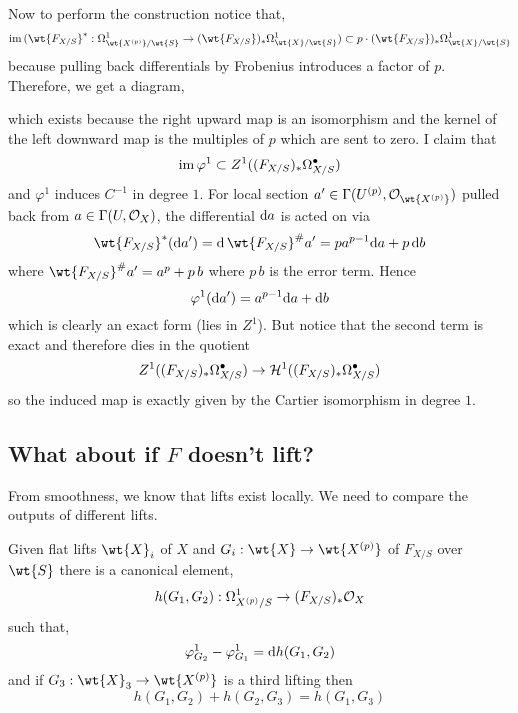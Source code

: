 \documentclass[12pt]{article}
\begin{document}
Now to perform the construction notice that,
\[ \im{(\wt{F_{X/S}}^* : \Omega^1_{\wt{X^{(p)}}/\wt{S}} \to (\wt{F_{X/S}})_* \Omega^1_{\wt{X}/\wt{S}})} \subset p \cdot (\wt{F_{X/S}})_* \Omega^1_{\wt{X}/\wt{S}} \]
because pulling back differentials by Frobenius introduces a factor of $p$. Therefore, we get a diagram,
\begin{center}
\end{center}
which exists because the right upward map is an isomorphism and the kernel of the left downward map is the multiples of $p$ which are sent to zero. 
I claim that
\[ \operatorname{\mathrm{im}}{\varphi^1} \subset Z^1((F_{X/S})_* \Omega^\bullet_{X/S}) \]
and $\varphi^1$ induces $C^{-1}$ in degree $1$. For local section $a'\in \Gamma(U^{(p)}, \struct{\wt{X^{(p)}}})$ pulled back from $a \in \Gamma(U, \mathcal{O}_{X})$, the differential $\mathrm{d}{a}$ is acted on via
\[ \wt{F_{X/S}}^*(\d{a'}) = \d{\,\wt{F_{X/S}}^\# a'} = p a^{p-1} \d{a} + p \, \d{b} \]
where $\wt{F_{X/S}}^\# a' = a^p + p \, b$ where $p \, b$ is the error term. Hence
\[ \varphi^1(\mathrm{d}{a'}) = a^{p-1} \mathrm{d}{a} + \mathrm{d}{b} \]
which is clearly an exact form (lies in $Z^1$). But notice that the second term is exact and therefore dies in the quotient
\[ Z^1((F_{X/S})_* \Omega^\bullet_{X/S}) \to \mathcal{H}^1((F_{X/S})_* \Omega^\bullet_{X/S}) \]
so the induced map is exactly given by the Cartier isomorphism in degree $1$.

\subsection{What about if $F$ doesn't lift?}

From smoothness, we know that lifts exist locally. We need to compare the outputs of different lifts. 

\begin{lemma}
Given flat lifts $\wt{X}_i$ of $X$ and $G_i : \wt{X} \to \wt{X^{(p)}}$ of $F_{X/S}$ over $\wt{S}$ there is a canonical element,
\[ h(G_1, G_2) : \Omega^1_{X^{(p)}/S} \to (F_{X/S})_* \mathcal{O}_{X} \]
such that,
\[ \varphi^1_{G_2} - \varphi^1_{G_1} = \mathrm{d}{h(G_1, G_2)} \] 
and if $G_3 : \wt{X}_3 \to \wt{X^{(p)}}$ is a third lifting then
\[ h(G_1, G_2) + h(G_2, G_3) = h(G_1, G_3) \]
\end{lemma}
\end{document}
